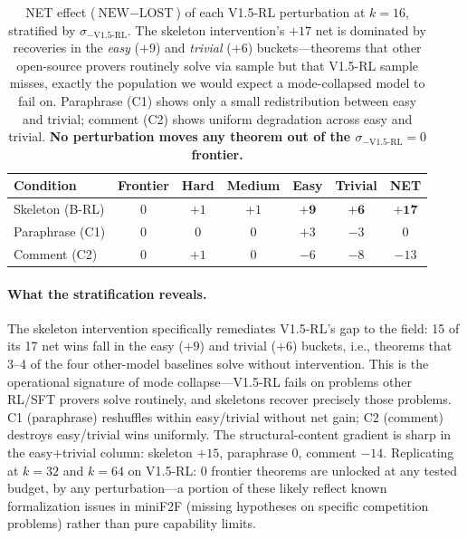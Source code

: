 \documentclass{article}
\begin{document}
\begin{table}[h]
\centering
\small
\begin{tabular}{lcccccc}
\toprule
\textbf{Condition} & \textbf{Frontier} & \textbf{Hard} & \textbf{Medium} & \textbf{Easy} & \textbf{Trivial} & \textbf{NET} \\
\midrule
Skeleton (B-RL) & 0 & $+1$ & $+1$  & $\mathbf{+9}$  & $\mathbf{+6}$  & $\mathbf{+17}$ \\
Paraphrase (C1) & 0 & 0    & 0     & $+3$           & $-3$           & 0              \\
Comment (C2)    & 0 & $+1$ & 0     & $-6$           & $-8$           & $-13$          \\
\bottomrule
\end{tabular}
\caption{NET effect ($\text{NEW}-\text{LOST}$) of each V1.5-RL perturbation at $k{=}16$, stratified by $\sigma_{-\text{V1.5-RL}}$. The skeleton intervention's $+17$ net is dominated by recoveries in the \emph{easy} ($+9$) and \emph{trivial} ($+6$) buckets---theorems that other open-source provers routinely solve via sample but that V1.5-RL sample misses, exactly the population we would expect a mode-collapsed model to fail on. Paraphrase (C1) shows only a small redistribution between easy and trivial; comment (C2) shows uniform degradation across easy and trivial. \textbf{No perturbation moves any theorem out of the $\sigma_{-\text{V1.5-RL}}{=}0$ frontier.}}
\label{tab:bucket_strat}
\end{table}

\paragraph{What the stratification reveals.}
The skeleton intervention specifically remediates V1.5-RL's gap to the field: 15 of its 17 net wins fall in the easy ($+9$) and trivial ($+6$) buckets, i.e., theorems that 3--4 of the four other-model baselines solve without intervention. This is the operational signature of mode collapse---V1.5-RL fails on problems other RL/SFT provers solve routinely, and skeletons recover precisely those problems. C1 (paraphrase) reshuffles within easy/trivial without net gain; C2 (comment) destroys easy/trivial wins uniformly. The structural-content gradient is sharp in the easy+trivial column: skeleton $+15$, paraphrase $0$, comment $-14$. Replicating at $k{=}32$ and $k{=}64$ on V1.5-RL: 0 frontier theorems are unlocked at any tested budget, by any perturbation---a portion of these likely reflect known formalization issues in miniF2F (missing hypotheses on specific competition problems) rather than pure capability limits.
\end{document}

